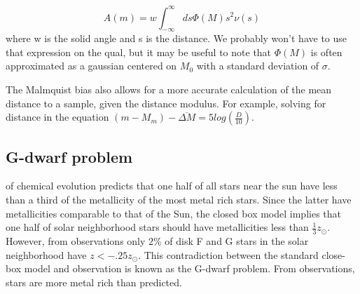 \begin{equation}
A(m) = w\int^\infty_{-\infty} ds \Phi(M) s^2 \nu(s)
\end{equation}
where w is the solid angle and s is the distance. We probably won't have to use that expression on the qual, but it may be useful to note that $\Phi(M)$ is often approximated as a gaussian centered on $M_0$ with a standard deviation of $\sigma$. 

The Malmquist bias also allows for a more accurate calculation of the mean distance to a sample, given the distance modulus. For example, solving for distance in the equation $(m-M_m)-\overline{\Delta M} = 5log\left(\frac{D}{10} \right)$.

\subsection{G-dwarf problem}

 of chemical evolution predicts that one half of all stars
near the sun have less than a third of the metallicity of the most metal rich stars.  Since
the latter have metallicities comparable to that of the Sun, the closed box model implies
that one half of solar neighborhood stars should have metallicities less than
$\frac{1}{3}z_\odot$.  However, from observations only $2$\% of disk F and G stars in the solar
neighborhood have $z < -.25 z_\odot$.  This contradiction between the standard close-box model
and observation is known as the G-dwarf problem.  From observations, stars are
more metal rich than predicted.

